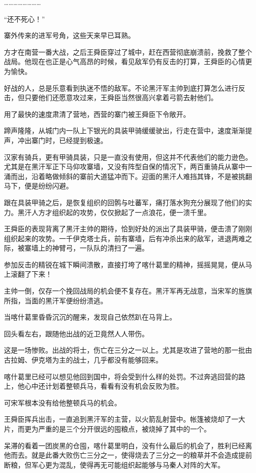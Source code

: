 ……………………

“还不死心！”

寨外传来的进军号角，这些天来早已耳熟。

方才在南营一番大战，之后王舜臣穿过了城中，赶在西营彻底崩溃前，挽救了整个战局。他现在也正是心气高昂的时候，看见敌军仍有反击的打算，王舜臣的心情更为愉快。

好战的人，总是乐意看到执迷不悟的敌军。不论黑汗军主帅到底打算怎么进行反击，但只要他们还愿意攻过来，王舜臣当然很高兴拿着弓箭去射他们。

用了最快的速度肃清了营地，西营的寨门被王舜臣下令敞开。

蹄声隆隆，从城门内一队上下银光的具装甲骑缓缓驶出，行走在营中，速度渐渐提声，冲出寨门时，已经提到极速。

汉家有骑兵，更有甲骑具装，只是一直没有使用，但这并不代表他们的能力逊色。尤其是在黑汗军正下马仰攻寨墙，又没有阵型自保的情况下，两百重骑兵从寨中一涌而出，沿着略做倾斜的寨前大道猛冲而下。迎面的黑汗人难挡其锋，不是被挑翻马下，便是纷纷闪避。

跟在具装甲骑之后，是恢复组织的回鹘与吐蕃军，痛打落水狗充分展现了他们的实力。黑汗人方才组织起的攻势，仅仅掀起了一点浪花，便一溃千里。

王舜臣的表现背离了黑汗主帅的期待，恰到好处的派出了具装甲骑，便击溃了刚刚组织起来的攻势。一千伊克塔士兵，前有寨墙，后有冲杀出来的敌军，进退两难之际，被寨墙上的神臂弓，一队队的清扫了一遍。

参加反击的精锐在城下瞬间溃散，直接打垮了喀什葛里的精神，摇摇晃晃，便从马上滚翻了下来！

主帅一倒，仅存一个挽回战局的机会便不复存在。黑汗军再无战意，当宋军的旌旗所指，当面的黑汗军便纷纷溃逃。

当喀什葛里昏昏沉沉的醒来，发现自己依然趴在马背上。

回头看左右，跟随他出战的近卫竟然人人带伤。

这是一场惨败。出战的将士，伤亡在三分之一以上。尤其是攻进了营地的那一批由古拉姆、伊克塔为主的战士，几乎都没有能够回来。

喀什葛里已经可以想见他回到国中，将会受到什么样的处罚。不过奔逃回营的路上，他心中还计划着整顿兵马，看看有没有机会反败为胜。

可宋军根本没有给他整顿兵马的机会。

王舜臣挥兵出击，一直追到黑汗军的主营，以火箭乱射营中。帐篷被烧却了一大片，而更为严重的是三个分开很远的囤粮点，被烧掉了其中的一个。

呆滞的看着一团炭黑的仓囤，喀什葛里明白，没有什么最后的机会了，胜利已经离他而去。就是此番大败伤亡三分之一，使得烧去了三分之一的粮草并不会造成提前断粮，但军心更为混乱，使得再无可能组织起能够与马秦人对阵的大军。

